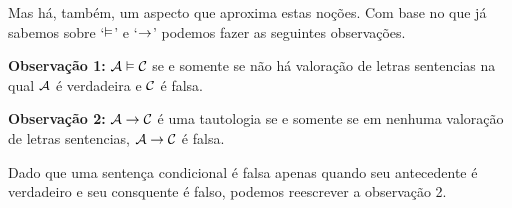 Mas há, também, um aspecto que aproxima estas noções.
Com base no que já sabemos sobre `$\vDash$' e `$\rightarrow$' podemos fazer as seguintes observações.

	\begin{ebullet}
		\item[\textbf{Observação 1:}] $\mathcal{A} \vDash \mathcal{C}$ se e somente se não há valoração de letras sentencias na qual $\mathcal{A}$ é verdadeira e $\mathcal{C}$ é falsa.
	\end{ebullet}

	\begin{ebullet}
		\item[\textbf{Observação 2:}] $\mathcal{A} \rightarrow \mathcal{C}$ é uma tautologia se e somente se em nenhuma valoração de letras sentencias, $\mathcal{A} \rightarrow \mathcal{C}$ é falsa.
	\end{ebullet}
Dado que uma sentença condicional é falsa apenas quando seu antecedente é verdadeiro e seu consquente é falso, podemos reescrever a observação 2.

